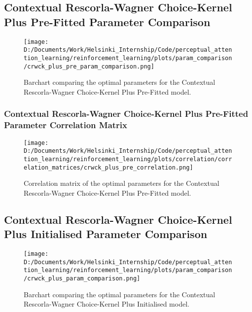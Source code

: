 \documentclass[12pt]{article}
\newcommand{\correlation}{0.25}
\newcommand{\parameter}{0.35}
\begin{document}
\newpage

\subsection{Contextual Rescorla-Wagner Choice-Kernel Plus Pre-Fitted Parameter Comparison}

\begin{figure}[h]  %
	\centering
	\texttt{[image: D:/Documents/Work/Helsinki\_Internship/Code/perceptual\_attention\_learning/reinforcement\_learning/plots/param\_comparison/crwck\_plus\_pre\_param\_comparison.png]}  %
	\caption{Barchart comparing the optimal parameters for the Contextual Rescorla-Wagner Choice-Kernel Plus Pre-Fitted model.}
	\label{fig:crwck_plus_pre_model_parmeters}
\end{figure} 

\subsubsection{Contextual Rescorla-Wagner Choice-Kernel Plus Pre-Fitted Parameter Correlation Matrix}
\begin{figure}[h]  %
	\centering
	\texttt{[image: D:/Documents/Work/Helsinki\_Internship/Code/perceptual\_attention\_learning/reinforcement\_learning/plots/correlation/correlation\_matrices/crwck\_plus\_pre\_correlation.png]}  %
	\caption{Correlation matrix of the optimal parameters for the Contextual Rescorla-Wagner Choice-Kernel Plus Pre-Fitted model.}
	\label{fig:crwck_plus_pre_correlation_matrix}
\end{figure} 
\clearpage

\subsection{Contextual Rescorla-Wagner Choice-Kernel Plus Initialised Parameter Comparison}

\begin{figure}[h]  %
	\centering
	\texttt{[image: D:/Documents/Work/Helsinki\_Internship/Code/perceptual\_attention\_learning/reinforcement\_learning/plots/param\_comparison/crwck\_plus\_param\_comparison.png]}  %
	\caption{Barchart comparing the optimal parameters for the Contextual Rescorla-Wagner Choice-Kernel Plus Initialised model.}
	\label{fig:crwck_plus_init_model_parmeters}
\end{figure} 
\newpage
\end{document}
